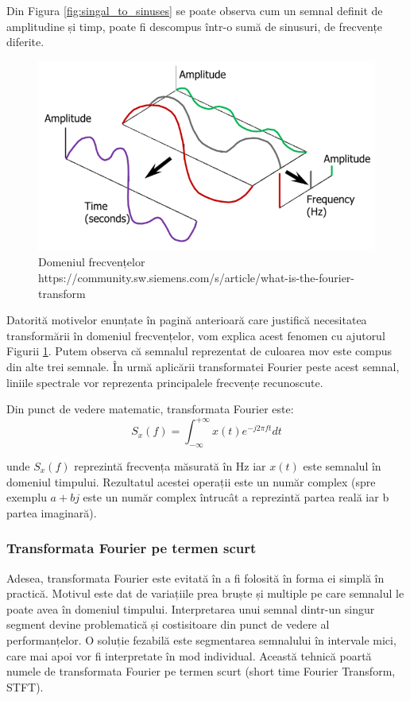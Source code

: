 \documentclass[a4paper, 12pt]{report}
\begin{document}
	Din Figura \ref{fig:singal_to_sinuses} se poate observa cum un semnal definit de amplitudine și timp, poate fi descompus într-o sumă de sinusuri, de frecvențe diferite.
	
	\begin{figure}[H]
		\begin{center}
			\includegraphics[scale=0.7]{images/FT_time_to_freq}
		\end{center}
		\caption{Domeniul frecvențelor \newline
			\hspace{\linewidth}https://community.sw.siemens.com/s/article/what-is-the-fourier-transform}
		\label{fig:signal_to_freq}
	\end{figure}

	Datorită motivelor enunțate în pagină anterioară care justifică necesitatea transformării în domeniul frecvențelor, vom explica acest fenomen cu ajutorul Figurii \ref{fig:signal_to_freq}. Putem observa că semnalul reprezentat de culoarea mov este compus din alte trei semnale. În urmă aplicării transformatei Fourier peste acest semnal, liniile spectrale vor reprezenta principalele frecvențe recunoscute.

	Din punct de vedere matematic, transformata Fourier este:
	\begin{equation}
		\label{ft_equation}
		S_x(f) = \int_{-\infty}^{+\infty} x(t)e^{-j2 \pi ft} dt
	\end{equation}
	
	unde $S_x(f)$ reprezintă frecvența măsurată în Hz iar $x(t)$ este semnalul în domeniul timpului. Rezultatul acestei operații este un număr complex (spre exemplu $a + bj$ este un număr complex întrucât a reprezintă partea reală iar b partea imaginară).
	
	\subsubsection{Transformata Fourier pe termen scurt}
	Adesea, transformata Fourier este evitată în a fi folosită în forma ei simplă în practică. Motivul este dat de variațiile prea bruște și multiple pe care semnalul le poate avea în domeniul timpului. Interpretarea unui semnal dintr-un singur segment devine problematică și costisitoare din punct de vedere al performanțelor. O soluție fezabilă este segmentarea semnalului în intervale mici, care mai apoi vor fi interpretate în mod individual. Această tehnică poartă numele de transformata Fourier pe termen scurt (short time Fourier Transform, STFT).
	
\end{document}
